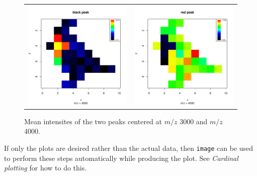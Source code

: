 \documentclass[a4paper]{article}
\begin{document}
\begin{figure}
\begin{center}
\begin{tabular}{cc}
\includegraphics{Cardinal-demo-071}
&
\includegraphics{Cardinal-demo-072}
\end{tabular}
\caption{\small Mean intensites of the two peaks centered at $m/z$ 3000 and $m/z$ 4000.}
\end{center}
\end{figure}
If only the plots are desired rather than the actual data, then \verb|image| can be used to perform these steps automatically while producing the plot. See \textit{Cardinal plotting} for how to do this.
\end{document}
